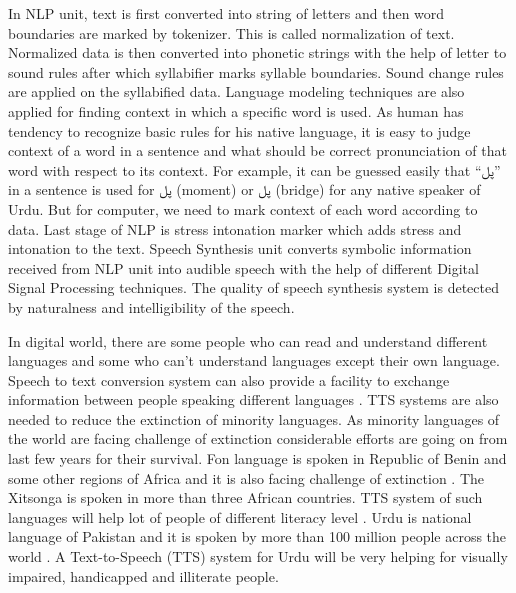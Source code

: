 In NLP unit, text is first converted into string of letters and then word boundaries are marked by
tokenizer. This is called normalization of text. Normalized data is then converted into phonetic strings
with the help of letter to sound rules after which syllabifier marks syllable boundaries. Sound change
rules are applied on the syllabified data. Language modeling techniques are also applied for finding
context in which a specific word is used. As human has tendency to recognize basic rules for his native
language, it is easy to judge context of a word in a sentence and what should be correct pronunciation of
that word with respect to its context. For example, it can be guessed easily that \enquote{\texturdu{پل}} in a sentence is used
for \texturdu{پل} (moment) or \texturdu{پل} (bridge) for any native speaker of Urdu. But for computer, we need to mark context of each word according to data. 
Last stage of NLP is stress intonation marker which adds stress and intonation to the text. Speech Synthesis unit converts symbolic information
received from NLP unit into audible speech with the help of different Digital Signal Processing
techniques. The quality of speech synthesis system is detected by naturalness and intelligibility of the speech.

In digital world, there are some people who can read and understand different languages and some
who can’t understand languages except their own language. Speech to text conversion system can
also provide a facility to exchange information between people speaking different languages \cite{khilari2015review}. 
TTS systems are also needed to reduce the extinction of
minority languages. As minority languages of the world are facing challenge of extinction
considerable efforts are going on from last few years for their survival. Fon language is spoken in
Republic of Benin and some other regions of Africa and it is also facing challenge of extinction \cite{dagba2014text}. 
The Xitsonga is spoken in more than three African countries.
TTS system of such languages will help lot of people of different literacy level \cite{baloyi2012text}.
Urdu is national language of Pakistan and it is spoken by more than 100 million people across the world \cite{top_30_languages}.
A Text-to-Speech (TTS) system for Urdu will be very helping for visually impaired, handicapped and illiterate people.

